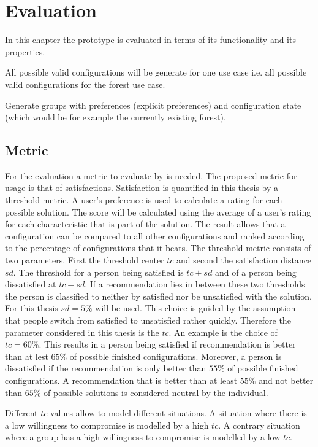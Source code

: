 \chapter{Evaluation}
\label{ch:Evaluation}

In this chapter the prototype is evaluated in terms of its functionality and its properties.

All possible valid configurations will be generate for one use case i.e. all possible valid configurations for the forest use case.

Generate groups with preferences (explicit preferences) and configuration state (which would be for example the currently existing forest).

\section{Metric}
\label{sec:Evaluation:Metrics}

For the evaluation a metric to evaluate by is needed. The proposed metric for usage is that of satisfactions. Satisfaction is quantified in this thesis by a threshold metric. A user's preference is used to calculate a rating for each possible solution. The score will be calculated using the average of a user's rating for each characteristic that is part of the solution. The result allows that a configuration can be compared to all other configurations and ranked according to the percentage of configurations that it beats. The threshold metric consists of two parameters. First the threshold center $tc$ and second the satisfaction distance $sd$. The threshold for a person being satisfied is $tc + sd$ and of a person being dissatisfied at $tc - sd$. If a recommendation lies in between these two thresholds the person is classified to neither by satisfied nor be unsatisfied with the solution. For this thesis  $sd=5\%$ will be used. This choice is guided by the assumption that people switch from satisfied to unsatisfied rather quickly. Therefore the parameter considered in this thesis is the $tc$. An example is the choice of $tc = 60\%$. This results in a person being satisfied if recommendation is better than at lest $65\%$ of possible finished configurations. Moreover, a person is dissatisfied if the recommendation is only better than $55\%$ of possible finished configurations. A recommendation that is better than at least $55\%$ and not better than $65\%$ of possible solutions is considered neutral by the individual.

Different $tc$ values allow to model different situations. A situation where there is a low willingness to compromise is modelled by a high $tc$. A contrary situation where a group has a high willingness to compromise is modelled by a low $tc$.

